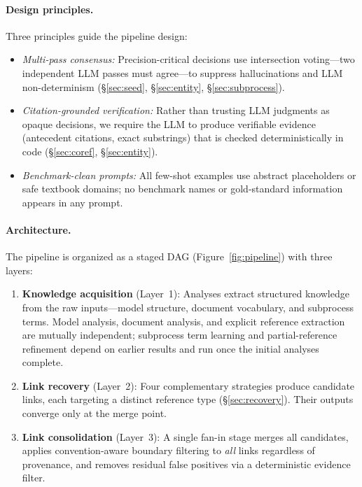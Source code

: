 \paragraph{Design principles.}
Three principles guide the pipeline design:
\begin{itemize}
    \item \emph{Multi-pass consensus:}
      Precision-critical decisions use intersection voting---two
      independent LLM passes must agree---to suppress hallucinations
      and LLM non-determinism (\S\ref{sec:seed},
      \S\ref{sec:entity}, \S\ref{sec:subprocess}).
    \item \emph{Citation-grounded verification:}
      Rather than trusting LLM judgments as opaque decisions, we
      require the LLM to produce verifiable evidence (antecedent
      citations, exact substrings) that is checked deterministically
      in code (\S\ref{sec:coref}, \S\ref{sec:entity}).
    \item \emph{Benchmark-clean prompts:}
      All few-shot examples use abstract placeholders or safe
      textbook domains; no benchmark names or gold-standard
      information appears in any prompt.
\end{itemize}

\paragraph{Architecture.}
The pipeline is organized as a staged DAG
(Figure~\ref{fig:pipeline}) with three layers:

\begin{enumerate}
    \item \textbf{Knowledge acquisition} (Layer~1): Analyses
      extract structured knowledge from the raw inputs---model
      structure, document vocabulary, and subprocess terms.
      Model analysis, document analysis, and explicit reference
      extraction are mutually independent; subprocess term learning
      and partial-reference refinement depend on earlier results and
      run once the initial analyses complete.
    \item \textbf{Link recovery} (Layer~2): Four complementary
      strategies produce candidate links, each targeting a distinct
      reference type (\S\ref{sec:recovery}). Their outputs converge
      only at the merge point.
    \item \textbf{Link consolidation} (Layer~3): A single fan-in
      stage merges all candidates, applies convention-aware boundary
      filtering to \emph{all} links regardless of provenance, and
      removes residual false positives via a deterministic evidence
      filter.
\end{enumerate}

